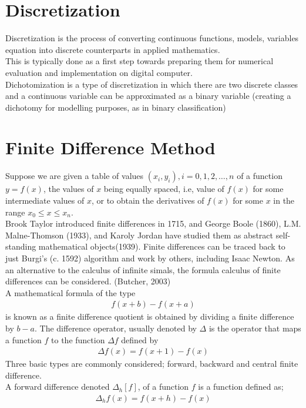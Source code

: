 \documentclass[11pt]{report}
\newcommand{\sps}{\\[0.2cm]}
\newcommand{\NI}{\noindent}
\begin{document}
	\section{Discretization}
	Discretization is the process of converting continuous functions, models, variables equation into discrete counterparts in applied mathematics.\sps
	This is typically done as a first step towards preparing them for numerical evaluation and implementation on digital computer.\sps
	Dichotomization is a type of discretization in which there are two discrete classes and a continuous variable can be approximated as a binary variable (creating a dichotomy for modelling purposes, as in binary classification)
	
	\section{Finite Difference Method}
	Suppose we are given a table of values $(x_i,y_i), i=0,1,2,\ldots,n$ of a function $y=f(x)$, the values of $x$ being equally spaced, i.e, value of $f(x)$ for some intermediate values of $x$, or to obtain the derivatives of $f(x)$ for some $x$ in the range $x_0 \leq x \leq x_n$.\sps
	Brook Taylor introduced finite differences in 1715, and George Boole (1860), L.M. Malne-Thomson (1933), and Karoly Jordan have studied them as abstract self-standing mathematical objects(1939). Finite differences can be traced back to just Burgi's (c. 1592) algorithm and work by others, including Isaac Newton. As an alternative to the calculus of infinite simals, the formula calculus of finite differences can be considered. (Butcher, 2003)\sps
	A mathematical formula of the type
	\begin{eqnarray}
		f(x+b)-f(x+a)
	\end{eqnarray}
	is known as a finite difference quotient is obtained by dividing a finite difference by $b-a$. The difference operator, usually denoted by $\Delta $ is the operator that maps a function $f$ to the function $\Delta f$ defined by
	\begin{eqnarray}
		\Delta f(x) = f(x+1) - f(x)
	\end{eqnarray}
	Three basic types are commonly considered; forward, backward and central finite difference.\sps
	
	\NI A forward difference denoted $\Delta_h[f]$, of a function $f$ is a function defined as;
	\begin{eqnarray}
		\Delta_h f(x) = f(x+h)-f(x)
	\end{eqnarray}
	
\end{document}
